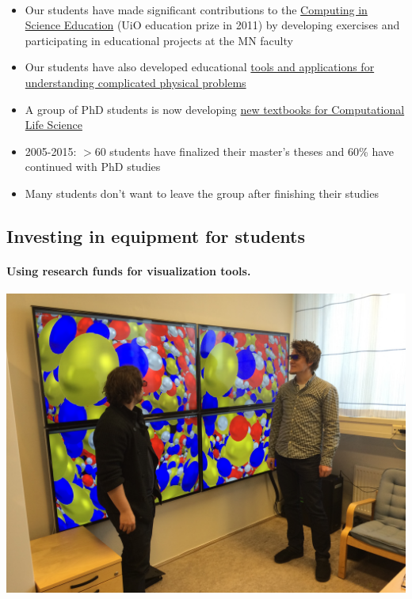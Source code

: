 \documentclass[%
<<<<<<< HEAD
<<<<<<< HEAD
oneside,                 %
final,                   %
=======
twoside,                 %
final,                   %
>>>>>>> 5fc06d357468ca5ec59d2d3ed0179709275f8f00
=======
oneside,                 %
final,                   %
>>>>>>> master
10pt]{article}
\begin{document}
\begin{itemize}
\paragraph{}
\begin{itemize}
\item Our students have made significant contributions to  the \href{{http://www.mn.uio.no/english/about/collaboration/cse/}}{Computing in Science Education}  (UiO education prize in 2011) by developing exercises and participating in educational projects at the MN faculty

\item Our students have also developed educational \href{{http://www.mn.uio.no/fysikk/om/aktuelt/aktuelle-saker/2015/realfagsapper.html}}{tools and applications for understanding complicated physical problems}

\item A group of PhD students is now developing \href{{https://github.com/CINPLA/ibvcse}}{new textbooks for Computational Life Science}

\item 2005-2015: $> 60$ students have finalized their master's theses and 60\% have continued with PhD studies

\item Many students don't want to leave the group after finishing their studies
\end{itemize}

\noindent






\subsection*{Investing in equipment for students}

\paragraph{Using research funds for visualization tools.}


\centerline{\includegraphics[width=0.7\linewidth]{fig-future/visualize.jpg}}





\end{itemize}
\end{document}
